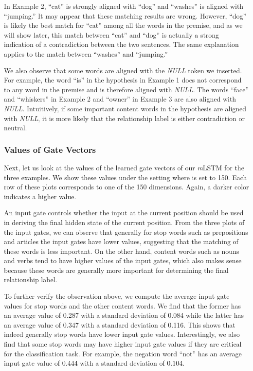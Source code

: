 \documentclass[11pt,letterpaper]{article}
\begin{document}
In Example 2, ``cat'' is strongly aligned with ``dog'' and ``washes'' is aligned with ``jumping.''
It may appear that these matching results are wrong.
However, ``dog'' is likely the best match for ``cat'' among all the words in the premise, and as we will show later, this match between ``cat'' and ``dog'' is actually a strong indication of a contradiction between the two sentences.
The same explanation applies to the match between ``washes'' and ``jumping.''

We also observe that some words are aligned with the \emph{NULL} token we inserted.
For example, the word ``is'' in the hypothesis in Example 1 does not correspond to any word in the premise and is therefore aligned with \emph{NULL}.
The words ``face'' and ``whiskers'' in Example 2 and ``owner'' in Example 3 are also aligned with \emph{NULL}.
Intuitively, if some important content words in the hypothesis 
are aligned with \emph{NULL}, it is more likely that the relationship label is either contradiction or neutral.


\subsubsection*{Values of Gate Vectors}

Next, let us look at the values of the learned gate vectors of our \emph{m}LSTM for the three examples.
We show these values under the setting where  is set to 150.
Each row of these plots corresponds to one of the 150 dimensions.
Again, a darker color indicates a higher value.

An input gate controls whether the input at the current position should be used in deriving the final hidden state of the current position.
From the three plots of the input gates, we can observe that generally for stop words such as prepositions and articles the input gates have lower values, suggesting that the matching of these words is less important.
On the other hand, content words such as nouns and verbs tend to have higher values of the input gates, which also makes sense because these words are generally more important for determining the final relationship label. 

To further verify the observation above, we compute the average input gate values for stop words and the other content words. 
We find that the former has an average value of 0.287 with a standard deviation of 0.084 while the latter has an average value of 0.347 with a standard deviation of 0.116. 
This shows that indeed generally stop words have lower input gate values.
Interestingly, we also find that some stop words may have higher input gate values if they are critical for the classification task.
For example, the negation word ``not'' has an average input gate value of 0.444 with a standard deviation of 0.104.
\end{document}
